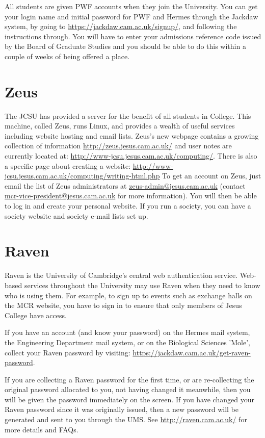 \documentclass[11pt,fleqn, oneside]{book} %
\begin{document}
All students are given PWF accounts when they join the University. You can get your login name and initial password for PWF and Hermes through the Jackdaw system, by going to \url{https://jackdaw.cam.ac.uk/signup/}, and following the instructions through.  You will have to enter your admissions reference code issued by the Board of Graduate Studies and you should be able to do this within a couple of weeks of being offered a place. 
   
\section{Zeus}
   
The JCSU has provided a server for the benefit of all students in College. This machine, called Zeus, runs Linux, and provides a wealth of useful services including website hosting and email lists. Zeus’s new webpage contains a growing collection of information \url{http://zeus.jesus.cam.ac.uk/} and user notes are currently located at: \url{http://www-jcsu.jesus.cam.ac.uk/computing/}. There is also a specific page about creating a website: \url{http://www-jcsu.jesus.cam.ac.uk/computing/writing-html.php}
To get an account on Zeus, just email the list of Zeus administrators at \url{zeus-admin@jesus.cam.ac.uk} (contact \url{mcr-vice-president@jesus.cam.ac.uk} for more information). You will then be able to log in and create your personal website. If you run a society, you can have a society website and society e-mail lists set up. 
   
\section{Raven}
   
Raven is the University of Cambridge's central web authentication service. Web-based services throughout the University may use Raven when they need to know who is using them.  For example, to sign up to events such as exchange halls on the MCR website, you have to sign in to ensure that only members of Jesus College have access.
   
If you have an account (and know your password) on the Hermes mail system, the Engineering Department mail system, or on the Biological Sciences 'Mole', collect your Raven password by visiting: \url{https://jackdaw.cam.ac.uk/get-raven-password}. 
   
If you are collecting a Raven password for the first time, or are re-collecting the original password allocated to you, not having changed it meanwhile, then you will be given the password immediately on the screen. If you have changed your Raven password since it was originally issued, then a new password will be generated and sent to you through the UMS. 
See \url{http://raven.cam.ac.uk/} for more details and FAQs.
   
\end{document}
